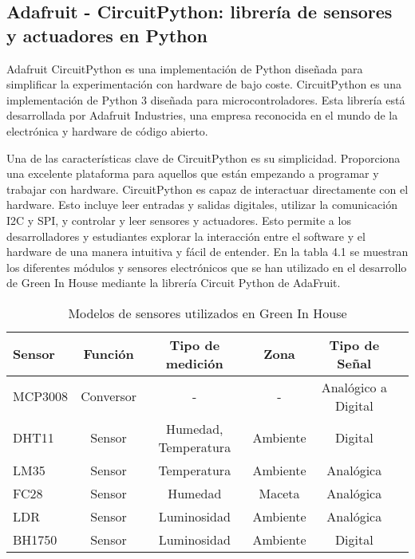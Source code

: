     \subsection{Adafruit - CircuitPython: librería de sensores y actuadores en Python}
    Adafruit CircuitPython \cite{wiki:adafruit_circuit_python} es una implementación de Python diseñada para simplificar la experimentación con hardware de bajo coste. CircuitPython es una implementación de Python 3 diseñada para microcontroladores. Esta librería está desarrollada por Adafruit Industries, una empresa reconocida en el mundo de la electrónica y hardware de código abierto.    
    
    Una de las características clave de CircuitPython es su simplicidad. Proporciona una excelente plataforma para aquellos que están empezando a programar y trabajar con hardware. CircuitPython es capaz de interactuar directamente con el hardware. Esto incluye leer entradas y salidas digitales, utilizar la comunicación I2C y SPI, y controlar y leer sensores y actuadores. Esto permite a los desarrolladores y estudiantes explorar la interacción entre el software y el hardware de una manera intuitiva y fácil de entender. En la tabla 4.1 se muestran los diferentes módulos y sensores electrónicos que se han utilizado en el desarrollo de Green In House mediante la librería Circuit Python de AdaFruit.
    \begin{table}[ht]
    \resizebox{13cm}{!} {
    \centering
    \begin{tabular}{|l|c|c|c|c|c|}
    \hline \textbf{Sensor} & \textbf{Función} & \textbf{Tipo de medición} & \textbf{Zona} & \textbf{Tipo de Señal} \\
    \hline MCP3008 & Conversor & - & - & Analógico a Digital \\
    \hline DHT11 & Sensor & Humedad, Temperatura & Ambiente & Digital \\
    \hline LM35 & Sensor & Temperatura & Ambiente & Analógica \\
    \hline FC28 & Sensor & Humedad & Maceta & Analógica \\
    \hline LDR & Sensor & Luminosidad & Ambiente & Analógica \\
    \hline BH1750 & Sensor & Luminosidad & Ambiente & Digital \\
    \hline
    \end{tabular}
    }
    \caption{Modelos de sensores utilizados en Green In House}
    \end{table}

